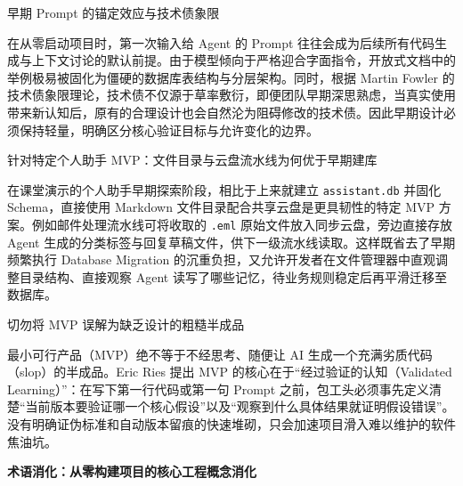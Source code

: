 \documentclass[UTF8,a4paper,11pt,fontset=fandol]{ctexart}
\begin{document}
\begin{importantbox}{早期 Prompt 的锚定效应与技术债象限}

在从零启动项目时，第一次输入给 Agent 的 Prompt 往往会成为后续所有代码生成与上下文讨论的默认前提。由于模型倾向于严格迎合字面指令，开放式文档中的举例极易被固化为僵硬的数据库表结构与分层架构。同时，根据 Martin Fowler 的技术债象限理论，技术债不仅源于草率敷衍，即便团队早期深思熟虑，当真实使用带来新认知后，原有的合理设计也会自然沦为阻碍修改的技术债。因此早期设计必须保持轻量，明确区分核心验证目标与允许变化的边界。

\end{importantbox}

\begin{knowledgebox}{针对特定个人助手 MVP：文件目录与云盘流水线为何优于早期建库}

在课堂演示的个人助手早期探索阶段，相比于上来就建立 \texttt{assistant.db} 并固化 Schema，直接使用 Markdown 文件目录配合共享云盘是更具韧性的特定 MVP 方案。例如邮件处理流水线可将收取的 \texttt{.eml} 原始文件放入同步云盘，旁边直接存放 Agent 生成的分类标签与回复草稿文件，供下一级流水线读取。这样既省去了早期频繁执行 Database Migration 的沉重负担，又允许开发者在文件管理器中直观调整目录结构、直接观察 Agent 读写了哪些记忆，待业务规则稳定后再平滑迁移至数据库。

\end{knowledgebox}

\begin{warningbox}{切勿将 MVP 误解为缺乏设计的粗糙半成品}

最小可行产品（MVP）绝不等于不经思考、随便让 AI 生成一个充满劣质代码（slop）的半成品。Eric Ries 提出 MVP 的核心在于“经过验证的认知（Validated Learning）”：在写下第一行代码或第一句 Prompt 之前，包工头必须事先定义清楚“当前版本要验证哪一个核心假设”以及“观察到什么具体结果就证明假设错误”。没有明确证伪标准和自动版本留痕的快速堆砌，只会加速项目滑入难以维护的软件焦油坑。

\end{warningbox}

\par{}\textbf{术语消化：从零构建项目的核心工程概念消化}
\end{document}
